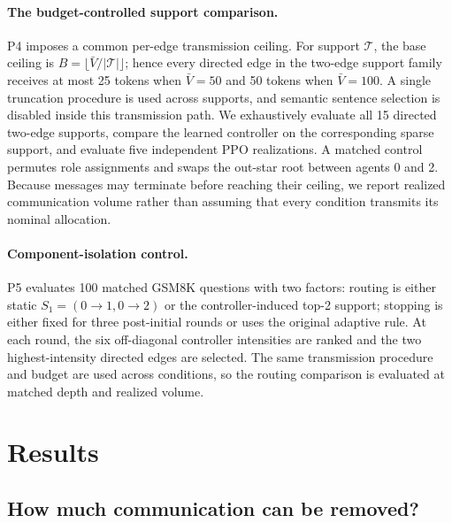 \documentclass[11pt]{article}
\begin{document}
\paragraph{The budget-controlled support comparison.}
\label{sec:p4design}
P4 imposes a common per-edge transmission ceiling. For support
$\mathcal T$, the base ceiling is
$B=\lfloor\bar V/|\mathcal T|\rfloor$; hence every directed edge in the
two-edge support family receives at most 25 tokens when $\bar V=50$ and 50
tokens when $\bar V=100$. A single truncation procedure is used across
supports, and semantic sentence selection is disabled inside this transmission
path. We exhaustively evaluate all 15 directed two-edge supports, compare the
learned controller on the corresponding sparse support, and evaluate five
independent PPO realizations. A matched control permutes role assignments and
swaps the out-star root between agents 0 and 2. Because messages may terminate
before reaching their ceiling, we report realized communication volume rather
than assuming that every condition transmits its nominal allocation.

\paragraph{Component-isolation control.}
\label{sec:p5design}
P5 evaluates 100 matched GSM8K questions with two factors: routing is either
static $S_1=(0\!\to\!1,0\!\to\!2)$ or the controller-induced top-2 support;
stopping is either fixed for three post-initial rounds or uses the original
adaptive rule. At each round, the six off-diagonal controller intensities are
ranked and the two highest-intensity directed edges are selected. The same
transmission procedure and budget are used across conditions, so the routing
comparison is evaluated at matched depth and realized volume.

\section{Results}
\label{sec:results}

\subsection{How much communication can be removed?}
\label{sec:rq1}
\end{document}
